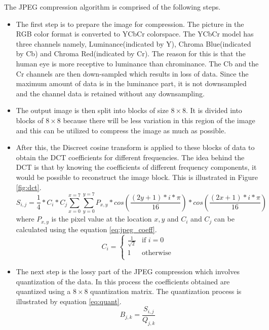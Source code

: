 The JPEG compression algorithm is comprised of the following steps.
\begin{itemize}
\item The first step is to prepare the image for compression. The picture in the RGB color format is converted to YCbCr colorspace. The YCbCr model has three channels namely, Luminance(indicated by Y), Chroma Blue(indicated by Cb) and Chroma Red(indicated by Cr). The reason for this is that the human eye is more receptive to luminance than chrominance. The Cb and the Cr channels are then down-sampled which results in loss of data. Since the maximum amount of data is in the luminance part, it is not downsampled and the channel data is retained without any downsampling. 
\item The output image is then split into blocks of size $8 \times 8$.  It is divided into blocks of $8 \times 8$ because there will be less variation in this region of the image and this can be utilized to compress the image as much as possible.
\item After this, the Discreet cosine transform is applied to these blocks of data to obtain the DCT coefficients for different frequencies. The idea behind the DCT is that by knowing the coefficients of different frequency components, it would be possible to reconstruct the image block. This is illustrated in Figure \ref{fig:dct}.
\begin{equation}
 S_{i,j} = \frac{1}{4} * C_i * C_j \sum_{x=0}^{x=7}\sum_{y=0}^{y=7}P_{x,y} *cos(\frac{(2y+1)*i*\pi}{16})*cos(\frac{(2x+1)*i*\pi}{16})
\end{equation}
where $P_{x,y}$ is the pixel value at the location $x,y$ and $C_i$ and $C_j$ can be calculated using the equation \ref{eq:jpeg_coeff}.
\begin{equation}
  C_i =
  \begin{cases}
    \frac{1}{\sqrt{2}} & \text{if $i = 0$} \\
    1 & \text{otherwise} \\
  \end{cases}
  \label{eq:jpeg_coeff}
\end{equation}
\item The next step is the lossy part of the JPEG compression which involves quantization of the data. In this process the coefficients obtained are quantized using a $8 \times 8$ quantization matrix. The quantization process is illustrated by equation \ref{eq:quant}.
\begin{equation}
B_{j,k} = \frac{S_{i,j}}{Q_{j,k}}
\label{eq:quant}
\end{equation}


\end{itemize}
